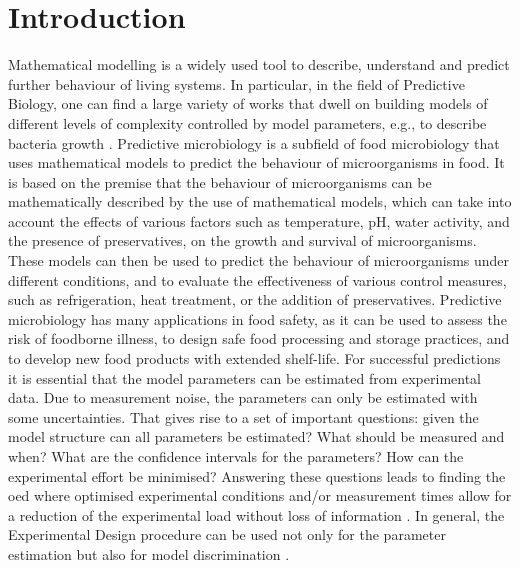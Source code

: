 \documentclass[10pt,A4paper]{article}
\begin{document}
\section*{Introduction}
%
Mathematical modelling is a widely used tool to describe, understand and predict further behaviour of living systems.
In particular, in the field of Predictive Biology, one can find a large variety of works that dwell on building models of different levels of complexity controlled by model parameters, e.g., to describe bacteria growth \cite{bernaertsConceptsToolsPredictive2004}.
Predictive microbiology is a subfield of food microbiology that uses mathematical models to predict the behaviour of microorganisms in food.
It is based on the premise that the behaviour of microorganisms can be mathematically described by the use of mathematical models, which can take into account the effects of various factors such as temperature, pH, water activity, and the presence of preservatives, on the growth and survival of microorganisms.
These models can then be used to predict the behaviour of microorganisms under different conditions, and to evaluate the effectiveness of various control measures, such as refrigeration, heat treatment, or the addition of preservatives.
Predictive microbiology has many applications in food safety, as it can be used to assess the risk of foodborne illness, to design safe food processing and storage practices, and to develop new food products with extended shelf-life.
For successful predictions it is essential that the model parameters can be estimated from experimental data.
Due to measurement noise, the parameters can only be estimated with some uncertainties.
That gives rise to a set of important questions: given the model structure can all parameters be estimated?
What should be measured and when? What are the confidence intervals for the parameters? How can the experimental effort be minimised?
Answering these questions leads to finding the \ac{oed} where optimised experimental conditions and/or measurement times allow for a reduction of the experimental load without loss of information \cite{derlindenImpactExperimentDesign2013, balsa-cantoe.bangaj.r.COMPUTINGOPTIMALDYNAMIC2008}.
In general, the Experimental Design procedure can be used not only for the parameter estimation but also for model discrimination \cite{kreutzSystemsBiology2009, stamatiOptimalExperimentalDesign2016}.
\end{document}
